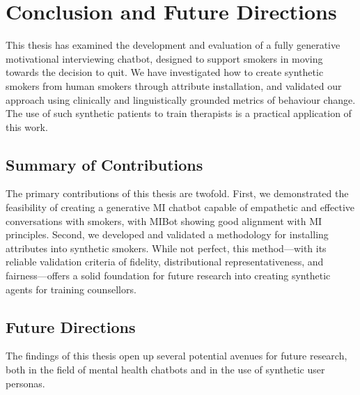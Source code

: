\chapter{Conclusion and Future Directions}
\label{ch:conclusion}

This thesis has examined the development and evaluation of a fully generative motivational interviewing chatbot, designed to support smokers in moving towards the decision to quit. We have investigated how to create synthetic smokers from human smokers through attribute installation, and validated our approach using clinically and linguistically grounded metrics of behaviour change. The use of such synthetic patients to train therapists is a practical application of this work.


\section{Summary of Contributions}

The primary contributions of this thesis are twofold. First, we demonstrated the feasibility of creating a generative MI chatbot capable of empathetic and effective conversations with smokers, with MIBot showing good alignment with MI principles. Second, we developed and validated a methodology for installing attributes into synthetic smokers. While not perfect, this method---with its reliable validation criteria of fidelity, distributional representativeness, and fairness---offers a solid foundation for future research into creating synthetic agents for training counsellors.


\section{Future Directions}
The findings of this thesis open up several potential avenues for future research, both in the field of mental health chatbots and in the use of synthetic user personas.

